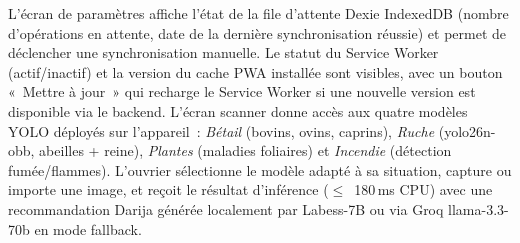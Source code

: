 L'écran de paramètres affiche l'état de la file d'attente Dexie IndexedDB
(nombre d'opérations en attente, date de la dernière synchronisation réussie)
et permet de déclencher une synchronisation manuelle. Le statut du Service Worker
(actif/inactif) et la version du cache PWA installée sont visibles, avec un
bouton «~Mettre à jour~» qui recharge le Service Worker si une nouvelle version
est disponible via le backend. L'écran scanner donne accès aux quatre modèles
YOLO déployés sur l'appareil~: \textit{Bétail} (bovins, ovins, caprins),
\textit{Ruche} (yolo26n-obb, abeilles + reine), \textit{Plantes} (maladies
foliaires) et \textit{Incendie} (détection fumée/flammes). L'ouvrier sélectionne
le modèle adapté à sa situation, capture ou importe une image, et reçoit le
résultat d'inférence ($\leq$~180\,ms CPU) avec une recommandation Darija
générée localement par Labess-7B ou via Groq llama-3.3-70b en mode fallback.

% 

